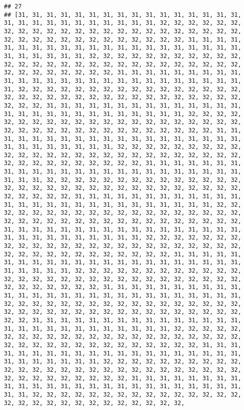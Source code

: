 \documentclass[
]{book}
\begin{document}
\begin{verbatim}
## 27
## [31, 31, 31, 31, 31, 31, 31, 31, 31, 31, 31, 31, 31, 31, 31, 31, 31, 31, 31, 31, 31, 31, 31, 31, 31, 31, 31, 32, 32, 32, 32, 32, 32, 32, 32, 32, 32, 32, 32, 32, 32, 32, 32, 32, 32, 32, 32, 32, 32, 32, 32, 32, 32, 32, 32, 32, 32, 32, 32, 32, 32, 32, 32, 31, 31, 31, 31, 31, 31, 31, 31, 31, 31, 31, 31, 31, 31, 31, 31, 31, 31, 31, 31, 31, 31, 31, 31, 31, 31, 31, 32, 32, 32, 32, 32, 32, 32, 32, 32, 32, 32, 32, 32, 32, 32, 32, 32, 32, 32, 32, 32, 32, 32, 32, 32, 32, 32, 32, 32, 32, 32, 32, 32, 32, 32, 32, 31, 31, 31, 31, 31, 31, 31, 31, 31, 31, 31, 31, 31, 31, 31, 31, 31, 31, 31, 31, 31, 31, 31, 31, 31, 31, 31, 32, 32, 32, 32, 32, 32, 32, 32, 32, 32, 32, 32, 32, 32, 32, 32, 32, 32, 32, 32, 32, 32, 32, 32, 32, 32, 32, 32, 32, 32, 32, 32, 32, 32, 32, 32, 31, 31, 31, 31, 31, 31, 31, 31, 31, 31, 31, 31, 31, 31, 31, 31, 31, 31, 31, 31, 31, 31, 31, 31, 31, 31, 31, 32, 32, 32, 32, 32, 32, 32, 32, 32, 32, 32, 32, 32, 32, 32, 32, 32, 32, 32, 32, 32, 32, 32, 32, 32, 32, 32, 32, 32, 32, 32, 32, 32, 32, 32, 32, 31, 31, 31, 31, 31, 31, 31, 31, 31, 31, 31, 31, 31, 31, 31, 31, 31, 31, 31, 31, 31, 31, 31, 31, 31, 31, 31, 32, 32, 32, 32, 32, 32, 32, 32, 32, 32, 32, 32, 32, 32, 32, 32, 32, 32, 32, 32, 32, 32, 32, 32, 32, 32, 32, 32, 32, 32, 32, 32, 32, 32, 32, 32, 31, 31, 31, 31, 31, 31, 31, 31, 31, 31, 31, 31, 31, 31, 31, 31, 31, 31, 31, 31, 31, 31, 31, 31, 31, 31, 31, 32, 32, 32, 32, 32, 32, 32, 32, 32, 32, 32, 32, 32, 32, 32, 32, 32, 32, 32, 32, 32, 32, 32, 32, 32, 32, 32, 32, 32, 32, 32, 32, 32, 32, 32, 32, 31, 31, 31, 31, 31, 31, 31, 31, 31, 31, 31, 31, 31, 31, 31, 31, 31, 31, 31, 31, 31, 31, 31, 31, 31, 31, 31, 32, 32, 32, 32, 32, 32, 32, 32, 32, 32, 32, 32, 32, 32, 32, 32, 32, 32, 32, 32, 32, 32, 32, 32, 32, 32, 32, 32, 32, 32, 32, 32, 32, 32, 32, 32, 31, 31, 31, 31, 31, 31, 31, 31, 31, 31, 31, 31, 31, 31, 31, 31, 31, 31, 31, 31, 31, 31, 31, 31, 31, 31, 31, 32, 32, 32, 32, 32, 32, 32, 32, 32, 32, 32, 32, 32, 32, 32, 32, 32, 32, 32, 32, 32, 32, 32, 32, 32, 32, 32, 32, 32, 32, 32, 32, 32, 32, 32, 32, 31, 31, 31, 31, 31, 31, 31, 31, 31, 31, 31, 31, 31, 31, 31, 31, 31, 31, 31, 31, 31, 31, 31, 31, 31, 31, 31, 32, 32, 32, 32, 32, 32, 32, 32, 32, 32, 32, 32, 32, 32, 32, 32, 32, 32, 32, 32, 32, 32, 32, 32, 32, 32, 32, 32, 32, 32, 32, 32, 32, 32, 32, 32, 31, 31, 31, 31, 31, 31, 31, 31, 31, 31, 31, 31, 31, 31, 31, 31, 31, 31, 31, 31, 31, 31, 31, 31, 31, 31, 31, 32, 32, 32, 32, 32, 32, 32, 32, 32, 32, 32, 32, 32, 32, 32, 32, 32, 32, 32, 32, 32, 32, 32, 32, 32, 32, 32, 32, 32, 32, 32, 32, 32, 32, 32, 32, 31, 31, 31, 31, 31, 31, 31, 31, 31, 31, 31, 31, 31, 31, 31, 31, 31, 31, 31, 31, 31, 31, 31, 31, 31, 31, 31, 32, 32, 32, 32, 32, 32, 32, 32, 32, 32, 32, 32, 32, 32, 32, 32, 32, 32, 32, 32, 32, 32, 32, 32, 32, 32, 32, 32, 32, 32, 32, 32, 32, 32, 32, 32, 31, 31, 31, 31, 31, 31, 31, 31, 31, 31, 31, 31, 31, 31, 31, 31, 31, 31, 31, 31, 31, 31, 31, 31, 31, 31, 31, 32, 32, 32, 32, 32, 32, 32, 32, 32, 32, 32, 32, 32, 32, 32, 32, 32, 32, 32, 32, 32, 32, 32, 32, 32, 32, 32, 32, 32, 32, 32, 32, 32, 32, 32, 32, 31, 31, 31, 31, 31, 31, 31, 31, 31, 31, 31, 31, 31, 31, 31, 31, 31, 31, 31, 31, 31, 31, 31, 31, 31, 31, 31, 32, 32, 32, 32, 32, 32, 32, 32, 32, 32, 32, 32, 32, 32, 32, 32, 32, 32, 32, 32, 32, 32, 32, 32, 32, 32, 32, 32, 
\end{verbatim}
\end{document}
